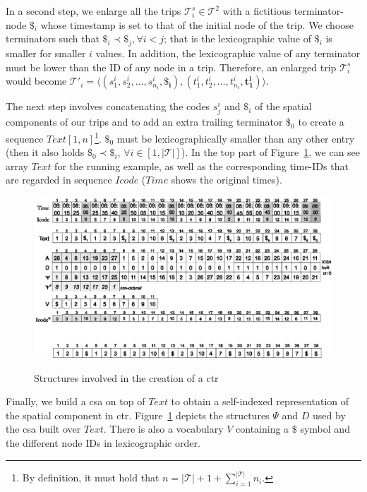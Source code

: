 	In a second step, we enlarge all the trips $\mathcal{T}^s_i \in \mathcal{T}^2$ with a fictitious terminator-node $\$_i$ whose
	timestamp is set to that of the initial node of the trip. We choose terminators such that $\$_i \prec \$_j, \forall i<j$; 
	that is the lexicographic value of $\$_i$ is smaller for smaller $i$ values. In addition, the lexicographic value
	of any terminator must be lower than the ID of any node in a trip. Therefore, an enlarged trip $\mathcal{T}^s_i$
	would become $\mathcal{T}'_i =  \langle (s^i_1, s^i_2, \dots,  s^i_{n_i}, 
	\mathbf{\$_i}),(t^i_1, t^i_2, \dots,  t^i_{n_i}, \mathbf{t^i_1}) \rangle$. 

	The next step involves concatenating the codes $s^i_j$ and $\$_i$ of the spatial components of our trips and to add an 
	extra trailing terminator $\$_0$ to create a sequence $Text[1,n]$\footnote{By definition, it must hold that $n = |\mathcal{T}| + 1 + \displaystyle\sum^{|\mathcal{T}|}_{i=1} n_i$.}. $\$_0$ must be  lexicographically 
	smaller than any other entry (then it also holds $\$_0 \prec \$_i$, $\forall i \in [1,|\mathcal{T}|]$). In the top part of
	Figure~\ref{fig:tcsa}, we can see array $Text$ for the running example, as well as the corresponding time-IDs that
	are regarded in sequence $Icode$  ($Time$ shows the original times).
	
	\begin{figure}[ht]
	  \begin{center}
	  {\includegraphics[width=1.00\textwidth]{figures/csttr.eps}}
	  \end{center}
	  \caption{Structures involved in the creation of a \acrshort{ctr}}
	  \label{fig:tcsa}
	\end{figure}

	Finally, we build a \gls{csa} on top of $Text$ to obtain a self-indexed representation of the spatial component in \gls{ctr}.
	Figure~\ref{fig:tcsa} depicts the structures $\Psi$ and $D$ used by the \gls{csa} built over $Text$. There is also a vocabulary
	$V$ containing a $\$$ symbol and the different node IDs in lexicographic order.

